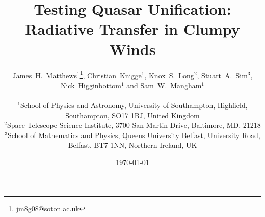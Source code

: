 \documentclass[useAMS,usenatbib]{mn2e_x}
\begin{document}


\def\py{\textsc{Python}}
\def\tar{\textsc{Tardis}}
\def\cld{\textsc{Cloudy}}
\def\agn{\textsc{Agnspec}}


\def\civ{C~\textsc{iv}}
\def\nv{N~\textsc{v}}
\def\hei{He~\textsc{i}}
\def\heii{He~\textsc{ii}}
\def\heiiline{He~\textsc{ii}~$4686$\AA}
\def\mg{Mg~\textsc{ii}}
\def\al{Al~\textsc{iii}}
\def\heii{He~\textsc{ii}}
\def\ovi{O~\textsc{vi}}
\def\la{Ly~$\alpha$}
\def\ha{H$\alpha$}
\def\hb{H$\beta$}
\def\civline{C~\textsc{iv}~$1550$\AA}
\def\nvline{N~\textsc{v}~$1240$\AA}
\def\mgline{Mg~\textsc{ii}~$2800$\AA}


\def\araa{ARAA}
\def\nat{Nature}
\def\apjl{ApJ Letters}
\def\aapr{AAPR}
\def\ssr{SSR}
\def\apj{ApJ}
\def\apjs{ApJs}
\def\pasp{PASP}
\def\aap{A\&A}
\def\mnras{MNRAS}
\def\aj{AJ}
\def\rmxaa{RMXAA}
\def\aaps{A\&As}
\def\LA{Lyman\thinspace$\alpha$}

\newcommand{\EXPN}[2]{\mbox{$#1\times 10^{#2}$}}
\newcommand{\EXPU}[3]{\mbox{\rm $#1 \times 10^{#2} \rm\:#3$}}  %
\newcommand{\POW}[2]{\mbox{$\rm10^{#1}\rm\:#2$}}
\def\LUM{\:{\rm erg\:s^{-1}}}
\def\FLUX{\:{\rm erg\:cm^{-2}\:s^{-1}}}
\def\OIGS{\:{\rm erg\:cm^{-2}\:s^{-1}\:\AA^{-1}}}

%
%

\title
[Radiative Transfer in Clumpy Winds]
{
Testing Quasar Unification: Radiative Transfer in Clumpy Winds
}


\author[Matthews et al.]{
\parbox[t]{\textwidth}{
James~H.~Matthews$^1$\thanks{jm8g08@soton.ac.uk}, Christian~Knigge$^1$, 
Knox~S.~Long$^2$, Stuart~A.~Sim$^3$, Nick~Higginbottom$^1$ and Sam~W.~Mangham$^1$
}
\medskip  
\\$^1$School of Physics and Astronomy, University of Southampton, Highfield, Southampton, SO17 1BJ, United Kingdom
\\$^2$Space Telescope Science Institute, 3700 San Martin Drive, Baltimore, MD, 21218
\\$^3$School of Mathematics and Physics, Queens University Belfast, University Road, Belfast, BT7 1NN, Northern Ireland, UK
}


\date{\today}

%
%
\end{document}
